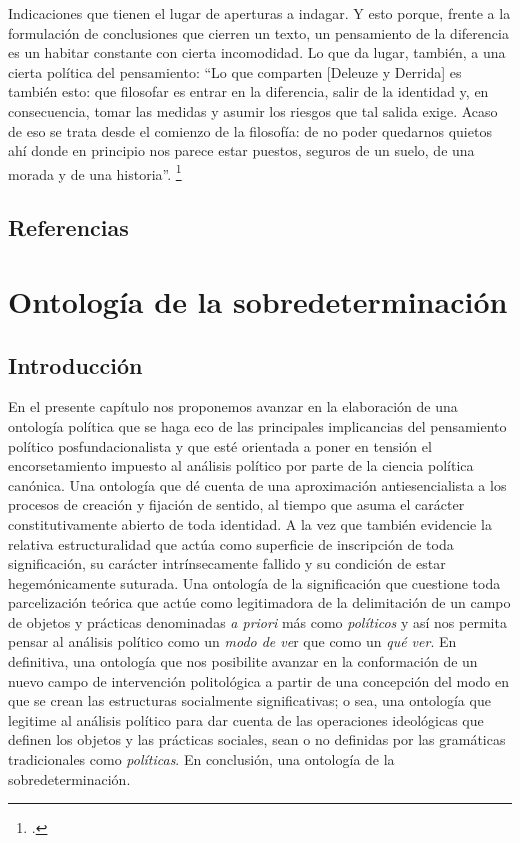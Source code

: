 Indicaciones que tienen el lugar de aperturas a indagar. Y esto porque, frente a la formulación de conclusiones que cierren un texto, un pensamiento de la diferencia es un habitar constante con cierta incomodidad. Lo que da lugar, también, a una cierta política del pensamiento: \enquote{Lo que comparten {[}Deleuze y Derrida{]} es también esto: que filosofar es entrar en la diferencia, salir de la identidad y, en consecuencia, tomar las medidas y asumir los riesgos que tal salida exige. Acaso de eso se trata desde el comienzo de la filosofía: de no poder quedarnos quietos ahí donde en principio nos parece estar puestos, seguros de un suelo, de una morada y de una historia}. \footcite[][261]{@6989-NANCY2008}

\section*{Referencias}
\printbibliography[heading=none]   %



\chapter{Ontología de la sobredeterminación}


\section{Introducción}

En el presente capítulo nos proponemos avanzar en la elaboración de una ontología política que se haga eco de las principales implicancias del pensamiento político posfundacionalista y que esté orientada a poner en tensión el encorsetamiento impuesto al análisis político por parte de la ciencia política canónica. Una ontología que dé cuenta de una aproximación antiesencialista a los procesos de creación y fijación de sentido, al tiempo que asuma el carácter constitutivamente abierto de toda identidad. A la vez que también evidencie la relativa estructuralidad que actúa como superficie de inscripción de toda significación, su carácter intrínsecamente fallido y su condición de estar hegemónicamente suturada. Una ontología de la significación que cuestione toda parcelización teórica que actúe como legitimadora de la delimitación de un campo de objetos y prácticas denominadas \emph{a priori} más como \emph{políticos} y así nos permita pensar  al análisis político  \linebreak como un \emph{modo de ve}r que como un \emph{qué ver}. En definitiva, una ontología que nos posibilite avanzar en la conformación de un nuevo campo de intervención politológica a partir de una concepción del modo en que se crean las estructuras socialmente significativas; o sea, una ontología que legitime al análisis político para dar cuenta de las operaciones ideológicas que definen los objetos y las prácticas sociales, sean o no definidas por las gramáticas tradicionales como \emph{políticas}. En conclusión, una ontología de la sobredeterminación.


